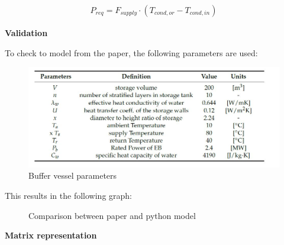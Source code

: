 \begin{equation}
	\begin{aligned}
		P_{req} = F_{supply} \cdot \left (T_{cond,or} - T_{cond,in} \right)
	\end{aligned}
\end{equation}

\textbf{Validation}

To check to model from the paper, the following parameters are used:

\begin{figure}[h]
	\centering
	\includegraphics[width=0.6\columnwidth]{Figures/parameters_paper.JPG}
	\caption[Short title]{Buffer vessel parameters}
\end{figure}

This results in the following graph:

\begin{figure}[H]
	\centering
	\qquad
	\caption{Comparison between paper and python model}
	\label{fig:Comparison}
\end{figure}

\textbf{Matrix representation}

